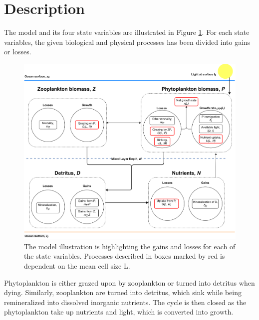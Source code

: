 \section{Description}
The model and its four state variables are illustrated in Figure \cref{fig:ModelIllust}. For each state variables, the given biological and physical processes has been divided into gains or losses.  
\begin{figure}[H]
\centering
\includegraphics[width=.90\linewidth]{Figures/ModelIllustration_HighRes1.png}
\caption{The model illustration is highlighting the gains and losses for each of the state variables. Processes described in boxes marked by red is dependent on the mean cell size L.}
\label{fig:ModelIllust}
\end{figure}
Phytoplankton is either grazed upon by zooplankton or turned into detritus when dying. Similarly, zooplankton are turned into detritus, which sink while being remineralized into dissolved inorganic nutrients. The cycle is then closed as the phytoplankton take up nutrients and light, which is converted into growth. 
\newpage
%
